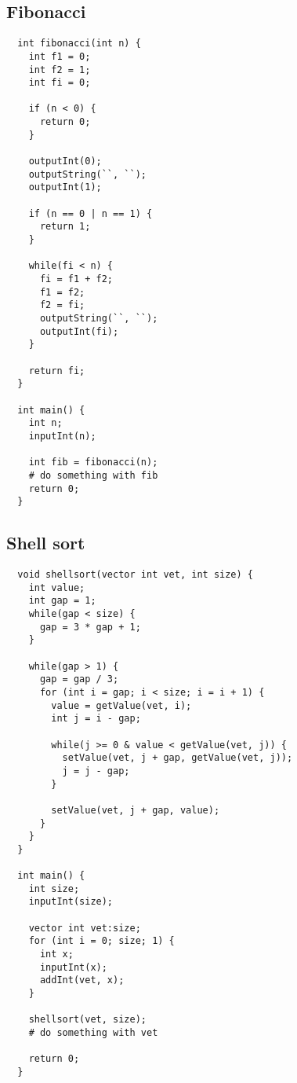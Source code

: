 \documentclass[a4paper, 11pt, article]{memoir}
\begin{document}
\subsection{Fibonacci}
\label{subsec:fibonacci}
\begin{lstlisting}
  int fibonacci(int n) {
    int f1 = 0;
    int f2 = 1;
    int fi = 0;

    if (n < 0) {
      return 0;
    }

    outputInt(0);
    outputString(``, ``);
    outputInt(1);

    if (n == 0 | n == 1) {
      return 1;
    }

    while(fi < n) {
      fi = f1 + f2;
      f1 = f2;
      f2 = fi;
      outputString(``, ``);
      outputInt(fi);
    }

    return fi;
  }

  int main() {
    int n;
    inputInt(n);

    int fib = fibonacci(n);
    # do something with fib
    return 0;
  }
\end{lstlisting}

\subsection{Shell sort}
\label{subsec:shelsort}
\begin{lstlisting}
  void shellsort(vector int vet, int size) {
    int value;
    int gap = 1;
    while(gap < size) {
      gap = 3 * gap + 1;
    }

    while(gap > 1) {
      gap = gap / 3;
      for (int i = gap; i < size; i = i + 1) {
        value = getValue(vet, i);
        int j = i - gap;

        while(j >= 0 & value < getValue(vet, j)) {
          setValue(vet, j + gap, getValue(vet, j));
          j = j - gap;
        }

        setValue(vet, j + gap, value);
      }
    }
  }

  int main() {
    int size;
    inputInt(size);

    vector int vet:size;
    for (int i = 0; size; 1) {
      int x;
      inputInt(x);
      addInt(vet, x);
    }

    shellsort(vet, size);
    # do something with vet

    return 0;
  }
\end{lstlisting}
\end{document}
